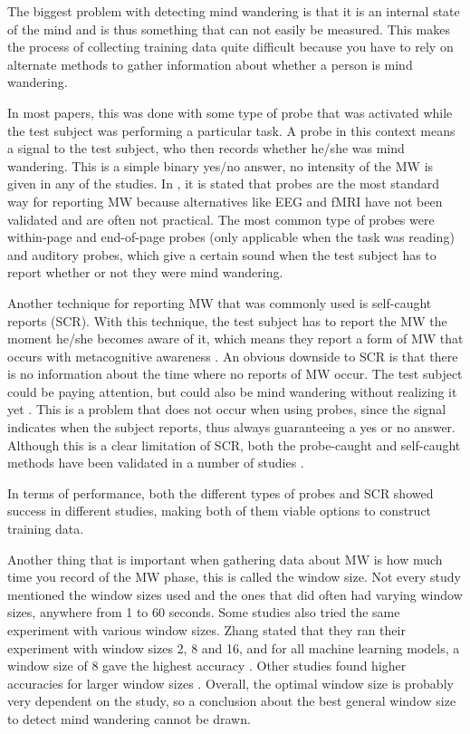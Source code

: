 The biggest problem with detecting mind wandering is that it is an internal state of the mind and is thus something that can not easily be measured. This makes the process of collecting training data quite difficult because you have to rely on alternate methods to gather information about whether a person is mind wandering.

In most papers, this was done with some type of probe that was activated while the test subject was performing a particular task. A probe in this context means a signal to the test subject, who then records whether he/she was mind wandering. This is a simple binary yes/no answer, no intensity of the MW is given in any of the studies. In \cite{Bixler2015AutomaticPhysiology}, it is stated that probes are the most standard way for reporting MW because alternatives like EEG and fMRI have not been validated and are often not practical. The most common type of probes were within-page and end-of-page probes (only applicable when the task was reading) and auditory probes, which give a certain sound when the test subject has to report whether or not they were mind wandering.

Another technique for reporting MW that was commonly used is self-caught reports (SCR). With this technique, the test subject has to report the MW the moment he/she becomes aware of it, which means they report a form of MW that occurs with metacognitive awareness \cite{Bixler2015AutomaticAwareness}. An obvious downside to SCR is that there is no information about the time where no reports of MW occur. The test subject could be paying attention, but could also be mind wandering without realizing it yet \cite{Bixler2015AutomaticAwareness}. This is a problem that does not occur when using probes, since the signal indicates when the subject reports, thus always guaranteeing a yes or no answer. Although this is a clear limitation of SCR, both the probe-caught and self-caught methods have been validated in a number of studies \cite{Bixler2015AutomaticPhysiology}. 

In terms of performance, both the different types of probes and SCR showed success in different studies, making both of them viable options to construct training data. 

Another thing that is important when gathering data about MW is how much time you record of the MW phase, this is called the window size. Not every study mentioned the window sizes used and the ones that did often had varying window sizes, anywhere from 1 to 60 seconds. Some studies also tried the same experiment with various window sizes. Zhang stated that they ran their experiment with window sizes 2, 8 and 16, and for all machine learning models, a window size of 8 gave the highest accuracy \cite{ISI:000443429900018}. Other studies found higher accuracies for larger window sizes \cite{Bixler2015AutomaticPhysiology}\cite{Bixler2015AutomaticAwareness}\cite{Stewart2017FaceComprehension}. Overall, the optimal window size is probably very dependent on the study, so a conclusion about the best general window size to detect mind wandering cannot be drawn.
